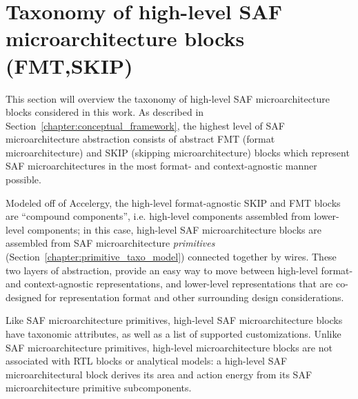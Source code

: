 \chapter{Taxonomy of high-level SAF microarchitecture blocks (FMT,SKIP)}
\label{chapter:saf_microarchitectures}




This section will overview the taxonomy of high-level SAF microarchitecture blocks considered in this work. As described in Section~\ref{chapter:conceptual_framework}, the highest level of SAF microarchitecture abstraction consists of abstract FMT (format microarchitecture) and SKIP (skipping microarchitecture) blocks which represent SAF microarchitectures in the most format- and context-agnostic manner possible.

Modeled off of Accelergy\cite{accelergy}, the high-level format-agnostic SKIP and FMT blocks are ``compound components'', i.e. high-level components assembled from lower-level components; in this case, high-level SAF microarchitecture blocks are assembled from SAF microarchitecture \textit{primitives} (Section~\ref{chapter:primitive_taxo_model}) connected together by wires. These two layers of abstraction, provide an easy way to move between high-level format- and context-agnostic representations, and lower-level representations that are co-designed for representation format and other surrounding design considerations.

Like SAF microarchitecture primitives, high-level SAF microarchitecture blocks have taxonomic attributes, as well as a list of supported customizations. Unlike SAF microarchitecture primitives, high-level microarchitecture blocks are not associated with RTL blocks or analytical models: a high-level SAF microarchitectural block derives its area and action energy from its SAF microarchitecture primitive subcomponents. 

